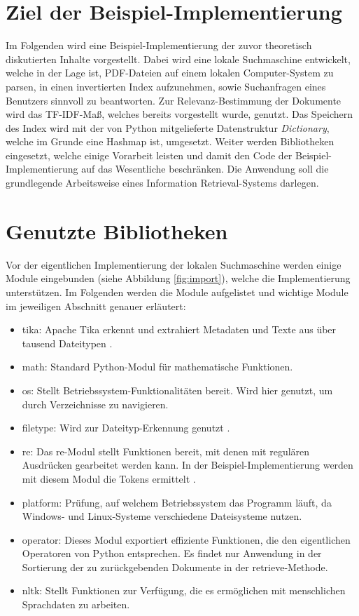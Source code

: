 \section{Ziel der Beispiel-Implementierung}\label{ziel-der-beispiel-implementierung}

Im Folgenden wird eine Beispiel-Implementierung der zuvor theoretisch diskutierten Inhalte vorgestellt. Dabei wird eine lokale Suchmaschine entwickelt, welche in der Lage ist, PDF-Dateien auf einem lokalen Computer-System zu parsen, in einen invertierten Index aufzunehmen, sowie Suchanfragen eines Benutzers sinnvoll zu beantworten. Zur Relevanz-Bestimmung der Dokumente wird das TF-IDF-Maß, welches bereits vorgestellt wurde, genutzt. Das Speichern des Index wird mit der von Python mitgelieferte Datenstruktur \textit{Dictionary}, welche im Grunde eine Hashmap ist, umgesetzt. Weiter werden Bibliotheken eingesetzt, welche einige Vorarbeit leisten und damit den Code der Beispiel-Implementierung auf das Wesentliche beschränken. Die Anwendung soll die grundlegende Arbeitsweise eines Information Retrieval-Systems darlegen.

\section{Genutzte Bibliotheken}\label{genutzte-bibliotheken}

Vor der eigentlichen Implementierung der lokalen Suchmaschine werden einige Module eingebunden (siehe Abbildung \ref{fig:import}), welche die Implementierung unterstützen. Im Folgenden werden die Module aufgelistet und wichtige Module im jeweiligen Abschnitt genauer erläutert:\newpage
\begin{itemize}
	\item tika: Apache Tika erkennt und extrahiert Metadaten und Texte aus über tausend Dateitypen \cite{Apache_Tika}.
	\item math: Standard Python-Modul für mathematische Funktionen.
	\item os: Stellt Betriebssystem-Funktionalitäten bereit. Wird hier genutzt, um durch Verzeichnisse zu navigieren.
	\item filetype: Wird zur Dateityp-Erkennung genutzt \cite{filetype}.
	\item re: Das re-Modul stellt Funktionen bereit, mit denen mit regulären Ausdrücken gearbeitet werden kann. In der Beispiel-Implementierung werden mit diesem Modul die Tokens ermittelt \cite{python_re}.
	\item platform: Prüfung, auf welchem Betriebssystem das Programm läuft, da Windows- und Linux-Systeme verschiedene Dateisysteme nutzen.
	\item operator: Dieses Modul exportiert effiziente Funktionen, die den eigentlichen Operatoren von Python entsprechen. Es findet nur Anwendung in der Sortierung der zu zurückgebenden Dokumente in der retrieve-Methode.
	\item nltk: Stellt Funktionen zur Verfügung, die es ermöglichen mit menschlichen Sprachdaten zu arbeiten.
\end{itemize}

